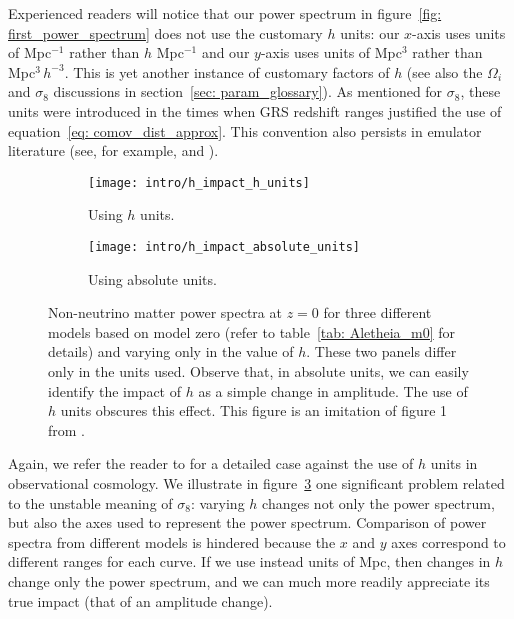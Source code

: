 
Experienced readers will notice that our power spectrum in
figure~\ref{fig: first_power_spectrum} does not use the customary $h$ units:
our $x$-axis uses units of Mpc$^{-1}$ rather than $h$ Mpc$^{-1}$ and our
$y$-axis uses units of Mpc$^3$ rather than Mpc$^3 \, h^{-3}$. This is yet
another instance of customary factors of $h$ (see also the $\Omega_i$ and
$\sigma_8$ discussions in section~\ref{sec: param_glossary}). As mentioned
for $\sigma_8$, these units were introduced in the times when GRS redshift 
ranges justified the use of equation~\ref{eq: comov_dist_approx}. This
convention also persists in emulator literature (see, for example,
 and ).

\begin{figure}[htb]
    \begin{subfigure}{0.45 \textwidth}
    \centering
 		\texttt{[image: intro/h\_impact\_h\_units]}
 		\caption{Using $h$ units.}
 		\label{fig: h_units}
    \end{subfigure}
    \begin{subfigure}{0.45 \textwidth}
    \centering
 		\texttt{[image: intro/h\_impact\_absolute\_units]}
 		\caption{Using absolute units.}
 		\label{fig: without_h_units}
    \end{subfigure}
        \centering
    \caption[Impact of $h$ on $P(k)$]
    		{Non-neutrino matter power spectra at $z=0$ for three different
    		models based on model zero (refer to table~\ref{tab: Aletheia_m0} 
    		for details) and varying only in the value of $h$. These two
    		panels
    		differ only in the units used. Observe that, in absolute units, we
    		can easily identify the impact of $h$ as a simple change in
    		amplitude. The use of $h$ units obscures this effect. This figure 
    		is an imitation of figure 1 from .}
    \label{fig: h_unit_Pk}
\end{figure}


Again, we refer the reader to  for a detailed case against the
use of $h$ units in observational cosmology. We illustrate in
figure~\ref{fig: h_unit_Pk} one significant problem related to the
unstable meaning of $\sigma_8$: varying $h$ changes not only the power 
spectrum, but also the axes used to represent the power spectrum. Comparison 
of power spectra from different 
models is hindered because the $x$ and $y$ axes correspond to different ranges
for each curve. If we use instead units of Mpc, then changes in $h$ change
only the power spectrum, and we can much more readily appreciate its true
impact (that of an amplitude change).

